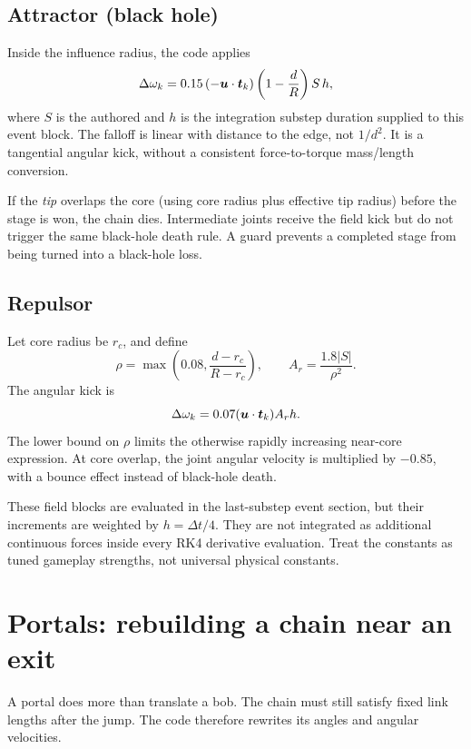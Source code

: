 \documentclass[11pt,a4paper]{article}
\newcommand{\code}[1]{\texttt{\detokenize{#1}}}
\begin{document}
\subsection{Attractor (black hole)}
Inside the influence radius, the code applies
\[
 \Delta\omega_k=0.15\left(-\boldsymbol{u}\cdot\boldsymbol{t}_k\right)
 \left(1-\frac dR\right)S\,h,
\]
where \(S\) is the authored \code{pullStrength} and \(h\) is the integration substep duration supplied to this event block. The falloff is linear with distance to the edge, not \(1/d^2\). It is a tangential angular kick, without a consistent force-to-torque mass/length conversion.

If the \emph{tip} overlaps the core (using core radius plus effective tip radius) before the stage is won, the chain dies. Intermediate joints receive the field kick but do not trigger the same black-hole death rule. A guard prevents a completed stage from being turned into a black-hole loss.
\subsection{Repulsor}
Let core radius be \(r_c\), and define
\[
 \rho=\max\left(0.08,\frac{d-r_c}{R-r_c}\right),\qquad
 A_r=\frac{1.8|S|}{\rho^2}.
\]
The angular kick is
\[
 \Delta\omega_k=0.07(\boldsymbol{u}\cdot\boldsymbol{t}_k)A_r h.
\]
The lower bound on \(\rho\) limits the otherwise rapidly increasing near-core expression. At core overlap, the joint angular velocity is multiplied by \(-0.85\), with a bounce effect instead of black-hole death.
\begin{arcade}These field blocks are evaluated in the last-substep event section, but their increments are weighted by \(h=\Delta t/4\). They are not integrated as additional continuous forces inside every RK4 derivative evaluation. Treat the constants as tuned gameplay strengths, not universal physical constants.\end{arcade}

\section{Portals: rebuilding a chain near an exit}
A portal does more than translate a bob. The chain must still satisfy fixed link lengths after the jump. The code therefore rewrites its angles and angular velocities.
\end{document}
